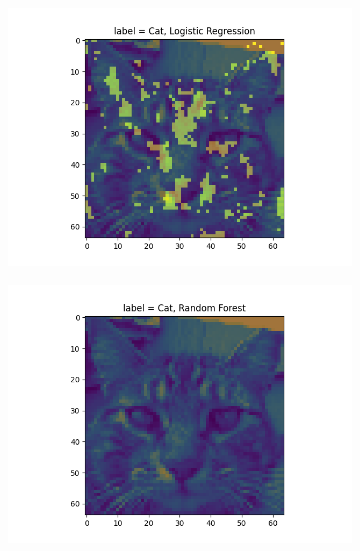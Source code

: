 \documentclass{article}
\begin{document}
\begin{figure}[H]
\begin{subfigure}{.33\textwidth}
  \centering
  \includegraphics[width=1\linewidth]{1b/Imp_feat LogReg.png}  
  
  \label{RandF}
\end{subfigure}
\begin{subfigure}{.33\textwidth}
  \centering
  \includegraphics[width=1\linewidth]{1b/Imp_feat RandForest.png}  
  

\end{subfigure}
\end{figure}
\end{document}
